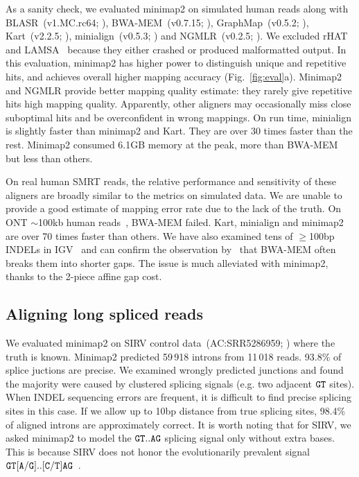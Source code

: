 \documentclass{bioinfo}
\begin{document}
As a sanity check, we evaluated minimap2 on simulated human reads along with
BLASR~(v1.MC.rc64; \citealp{Chaisson:2012aa}),
BWA-MEM~(v0.7.15; \citealp{Li:2013aa}),
GraphMap~(v0.5.2; \citealp{Sovic:2016aa}),
Kart~(v2.2.5; \citealp{Lin:2017aa}),
minialign~(v0.5.3; \citealp{Suzuki:2016}) and
NGMLR~(v0.2.5; \citealp{Sedlazeck169557}). We excluded rHAT~\citep{Liu:2016ab}
and LAMSA~\citep{Liu:2017aa} because they either
crashed or produced malformatted output. In this evaluation, minimap2 has
higher power to distinguish unique and repetitive hits, and achieves overall
higher mapping accuracy (Fig.~\ref{fig:eval}a). Minimap2 and
NGMLR provide better mapping quality estimate: they rarely give repetitive hits
high mapping quality.  Apparently, other aligners may
occasionally miss close suboptimal hits and be overconfident in wrong mappings.
On run time, minialign is slightly faster than minimap2 and Kart. They are over
30 times faster than the rest.  Minimap2 consumed 6.1GB memory at the peak,
more than BWA-MEM but less than others.

On real human SMRT reads, the relative performance and sensitivity of
these aligners are broadly similar to the metrics on simulated data. We are
unable to provide a good estimate of mapping error rate due to the lack of the
truth.  On ONT $\sim$100kb human reads~\citep{Jain128835}, BWA-MEM failed.
Kart, minialign and minimap2 are over 70 times faster than others. We have also
examined tens of $\ge$100bp INDELs in IGV~\citep{Robinson:2011aa} and can
confirm the observation by~\citet{Sedlazeck169557} that BWA-MEM often breaks
them into shorter gaps. The issue is much alleviated with minimap2, thanks
to the 2-piece affine gap cost.

\subsection{Aligning long spliced reads}

We evaluated minimap2 on SIRV control data~(AC:SRR5286959;
\citealp{Byrne:2017aa}) where the truth is known. Minimap2 predicted 59\,918
introns from 11\,018 reads. 93.8\% of splice juctions are precise. We examined
wrongly predicted junctions and found the majority were caused by clustered
splicing signals (e.g. two adjacent ${\tt GT}$ sites). When INDEL sequencing
errors are frequent, it is difficult to find precise splicing sites in this
case. If we allow up to 10bp distance from true splicing sites, 98.4\% of
aligned introns are approximately correct. It is worth noting that for SIRV, we
asked minimap2 to model the ${\tt GT..AG}$ splicing signal only without extra
bases. This is because SIRV does not honor the evolutionarily prevalent signal
${\tt GT[A/G]..[C/T]AG}$~\citep{Irimia:2008aa}.
\end{document}
